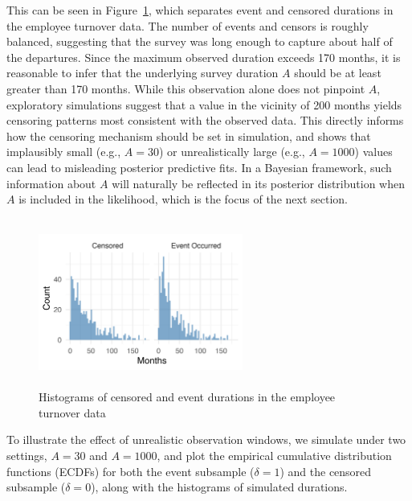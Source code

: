This can be seen in Figure~\ref{fig:离职数据分开的直方图}, which separates event and censored durations in the employee turnover data. The number of events and censors is roughly balanced, suggesting that the survey was long enough to capture about half of the departures. Since the maximum observed duration exceeds 170 months, it is reasonable to infer that the underlying survey duration $A$ should be at least greater than 170 months. While this observation alone does not pinpoint $A$, exploratory simulations suggest that a value in the vicinity of 200 months yields censoring patterns most consistent with the observed data. This directly informs how the censoring mechanism should be set in simulation, and shows that implausibly small (e.g., $A=30$) or unrealistically large (e.g., $A=1000$) values can lead to misleading posterior predictive fits. In a Bayesian framework, such information about $A$ will naturally be reflected in its posterior distribution when $A$ is included in the likelihood, which is the focus of the next section.
\begin{figure}[H]
    \centering
    \includegraphics[height=5.5cm, width=0.6\textwidth]{images/separate_hist.png}
    \caption{Histograms of censored and event durations in the employee turnover data}
    \label{fig:离职数据分开的直方图}
\end{figure}
To illustrate the effect of unrealistic observation windows, we simulate under two settings, $A = 30$ and $A = 1000$, and plot the empirical cumulative distribution functions (ECDFs) for both the event subsample ($\delta = 1$) and the censored subsample ($\delta = 0$), along with the histograms of simulated durations.
